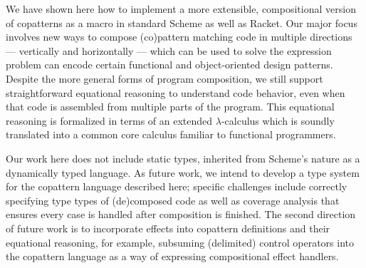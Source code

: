 We have shown here how to implement a more extensible, compositional version of copatterns as a macro in standard Scheme as well as Racket.
Our major focus involves new ways to compose (co)pattern matching code in multiple directions --- vertically and horizontally --- which can be used to solve the expression problem can encode certain functional and object-oriented design patterns.
Despite the more general forms of program composition, we still support straightforward equational reasoning to understand code behavior, even when that code is assembled from multiple parts of the program.
This equational reasoning is formalized in terms of an extended $\lambda$-calculus which is soundly translated into a common core calculus familiar to functional programmers.

Our work here does not include static types, inherited from Scheme's nature as a dynamically typed language.
As future work, we intend to develop a type system for the copattern language described here; specific challenges include correctly specifying type types of (de)composed code as well as coverage analysis that ensures every case is handled after composition is finished.
The second direction of future work is to incorporate effects into copattern definitions and their equational reasoning, for example, subsuming (delimited) control operators into the copattern language as a way of expressing compositional effect handlers.


